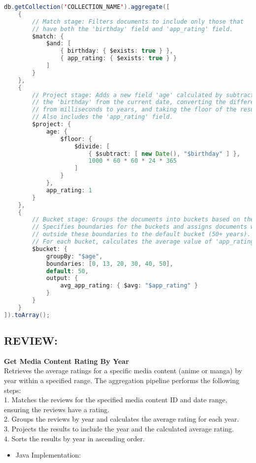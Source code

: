 \begin{mdframed}[style=customstyle]
\begin{lstlisting}[language=java]
db.getCollection('COLLECTION_NAME').aggregate([
    { 
        // Match stage: Filters documents to include only those that 
        // have both the 'birthday' field and 'app_rating' field.
        $match: { 
            $and: [
                { birthday: { $exists: true } }, 
                { app_rating: { $exists: true } }
            ]
        } 
    },
    { 
        // Project stage: Adds a new field 'age' calculated by subtracting 
        // the 'birthday' from the current date, converting the difference 
        // from milliseconds to years, and taking the floor of the result.
        // Also includes the 'app_rating' field.
        $project: { 
            age: { 
                $floor: { 
                    $divide: [
                        { $subtract: [ new Date(), "$birthday" ] },
                        1000 * 60 * 60 * 24 * 365
                    ]
                }
            },
            app_rating: 1 
        } 
    },
    { 
        // Bucket stage: Groups the documents into buckets based on the 'age' field.
        // Specifies boundaries for the buckets and assigns documents with an age 
        // outside these boundaries to the default bucket (50+ years).
        // For each bucket, calculates the average value of 'app_rating'.
        $bucket: {
            groupBy: "$age",
            boundaries: [0, 13, 20, 30, 40, 50],
            default: 50,
            output: { 
                avg_app_rating: { $avg: "$app_rating" }
            }
        }
    }
]).toArray();\end{lstlisting}
\end{mdframed}

\subsection*{REVIEW:}

\textbf{Get Media Content Rating By Year}\\
Retrieves the average ratings for a specific media content (anime or manga) by year within a specified range.
The aggregation pipeline performs the following steps:\\
1. Matches the reviews for the specified media content ID and date range, ensuring the reviews have a rating.\\
2. Groups the reviews by year and calculates the average rating for each year.\\
3. Projects the results to include the year and the calculated average rating.\\
4. Sorts the results by year in ascending order.
\begin{itemize}
    \item Java Implementation:
\end{itemize}

